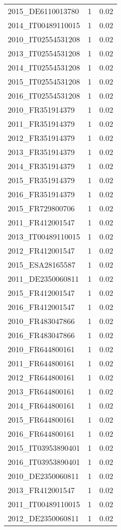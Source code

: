 \begin{table*}[htbp]
\begin{tabular}{lrr}
2015_DE6110013780 & 1 & 0.02 \\
2014_IT00489110015 & 1 & 0.02 \\
2010_IT02554531208 & 1 & 0.02 \\
2013_IT02554531208 & 1 & 0.02 \\
2014_IT02554531208 & 1 & 0.02 \\
2015_IT02554531208 & 1 & 0.02 \\
2016_IT02554531208 & 1 & 0.02 \\
2010_FR351914379 & 1 & 0.02 \\
2011_FR351914379 & 1 & 0.02 \\
2012_FR351914379 & 1 & 0.02 \\
2013_FR351914379 & 1 & 0.02 \\
2014_FR351914379 & 1 & 0.02 \\
2015_FR351914379 & 1 & 0.02 \\
2016_FR351914379 & 1 & 0.02 \\
2015_FR729800706 & 1 & 0.02 \\
2011_FR412001547 & 1 & 0.02 \\
2013_IT00489110015 & 1 & 0.02 \\
2012_FR412001547 & 1 & 0.02 \\
2015_ESA28165587 & 1 & 0.02 \\
2011_DE2350060811 & 1 & 0.02 \\
2015_FR412001547 & 1 & 0.02 \\
2016_FR412001547 & 1 & 0.02 \\
2010_FR483047866 & 1 & 0.02 \\
2016_FR483047866 & 1 & 0.02 \\
2010_FR644800161 & 1 & 0.02 \\
2011_FR644800161 & 1 & 0.02 \\
2012_FR644800161 & 1 & 0.02 \\
2013_FR644800161 & 1 & 0.02 \\
2014_FR644800161 & 1 & 0.02 \\
2015_FR644800161 & 1 & 0.02 \\
2016_FR644800161 & 1 & 0.02 \\
2015_IT03953890401 & 1 & 0.02 \\
2016_IT03953890401 & 1 & 0.02 \\
2010_DE2350060811 & 1 & 0.02 \\
2013_FR412001547 & 1 & 0.02 \\
2011_IT00489110015 & 1 & 0.02 \\
2012_DE2350060811 & 1 & 0.02 \\

\end{tabular}
\end{table*}
